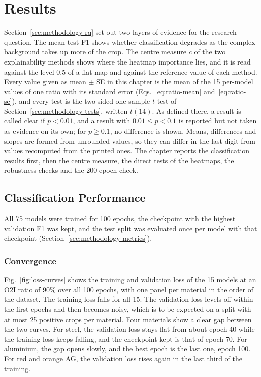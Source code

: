 \chapter{Results}
\label{sec:results}

Section~\ref{sec:methodology-rq} set out two layers of evidence for the research
question. The mean test F1 shows whether classification degrades as the complex
background takes up more of the crop. The centre measure $c$ of the two explainability
methods shows where the heatmap importance lies, and it is read against the level 0.5
of a flat map and against the reference value of each method. Every value given as
mean $\pm$ SE in this chapter is the mean of the 15 per-model values of one ratio with
its standard error (Eqs.~\eqref{eq:ratio-mean} and~\eqref{eq:ratio-se}), and every
test is the two-sided one-sample $t$ test of Section~\ref{sec:methodology-tests},
written $t(14)$. As defined there, a result is called clear if $p < 0.01$, and a
result with $0.01 \le p < 0.1$ is reported but not taken as evidence on its own; for
$p \ge 0.1$, no difference is shown. Means, differences and slopes are formed from
unrounded values, so they can differ in the last digit from values recomputed from the
printed ones. The chapter reports the classification results first, then the
centre measure, the direct tests of the heatmaps, the robustness checks and the
200-epoch check.

\section{Classification Performance}
\label{sec:results-training}

All 75 models were trained for 100 epochs, the checkpoint with the highest validation
F1 was kept, and the test split was evaluated once per model with that checkpoint
(Section~\ref{sec:methodology-metrics}).

\subsection{Convergence}
\label{sec:results-convergence}

Fig.~\ref{fig:loss-curves} shows the training and validation loss of the 15 models at
an O2I ratio of 90\% over all 100 epochs, with one panel per material in the order of the dataset. The training loss falls for all 15. The validation loss levels
off within the first epochs and then becomes noisy, which is to be expected on a split
with at most 25 positive crops per material. Four materials show a clear gap between
the two curves. For steel, the validation loss stays flat from about epoch 40 while the
training loss keeps falling, and the checkpoint kept is that of epoch 70. For
aluminium, the gap opens slowly, and the best epoch is the last one, epoch 100. For red
and orange AG, the validation loss rises again in the last third of the training.

